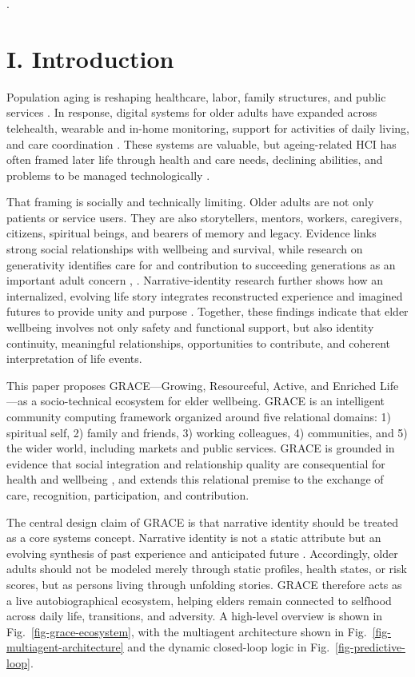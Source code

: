 \documentclass[
  journal,
]{IEEEtran}%
\begin{document}
.

\section{I. Introduction}\label{i.-introduction}

Population aging is reshaping healthcare, labor, family structures, and
public services . In response, digital
systems for older adults have expanded across telehealth, wearable and
in-home monitoring, support for activities of daily living, and care
coordination . These systems are
valuable, but ageing-related HCI has often framed later life through
health and care needs, declining abilities, and problems to be managed
technologically .

That framing is socially and technically limiting. Older adults are not
only patients or service users. They are also storytellers, mentors,
workers, caregivers, citizens, spiritual beings, and bearers of memory
and legacy. Evidence links strong social relationships with wellbeing
and survival, while research on generativity identifies care for and
contribution to succeeding generations as an important adult concern
,
. Narrative-identity
research further shows how an internalized, evolving life story
integrates reconstructed experience and imagined futures to provide
unity and purpose .
Together, these findings indicate that elder wellbeing involves not only
safety and functional support, but also identity continuity, meaningful
relationships, opportunities to contribute, and coherent interpretation
of life events.

This paper proposes GRACE---Growing, Resourceful, Active, and Enriched
Life---as a socio-technical ecosystem for elder wellbeing. GRACE is an
intelligent community computing framework organized around five
relational domains: 1) spiritual self, 2) family and friends, 3) working
colleagues, 4) communities, and 5) the wider world, including markets
and public services. GRACE is grounded in evidence that social
integration and relationship quality are consequential for health and
wellbeing , and extends this
relational premise to the exchange of care, recognition, participation,
and contribution.

The central design claim of GRACE is that narrative identity should be
treated as a core systems concept. Narrative identity is not a static
attribute but an evolving synthesis of past experience and anticipated
future . Accordingly, older
adults should not be modeled merely through static profiles, health
states, or risk scores, but as persons living through unfolding stories.
GRACE therefore acts as a live autobiographical ecosystem, helping
elders remain connected to selfhood across daily life, transitions, and
adversity. A high-level overview is shown in
Fig.~\ref{fig-grace-ecosystem}, with the multiagent architecture shown
in Fig.~\ref{fig-multiagent-architecture} and the dynamic closed-loop
logic in Fig.~\ref{fig-predictive-loop}.
\end{document}
